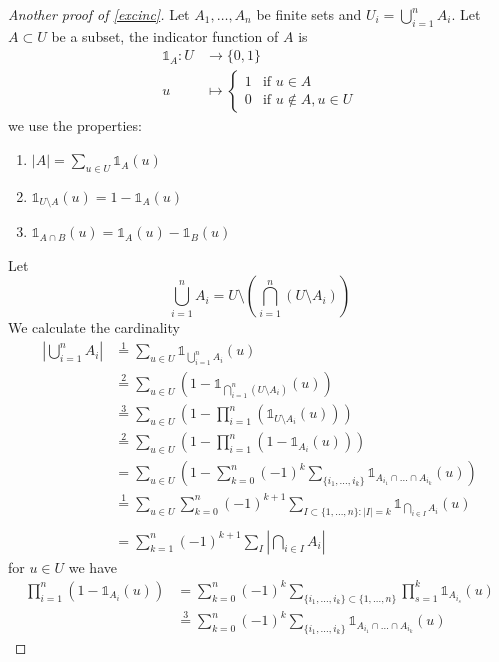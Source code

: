 \begin{example}
\begin{proof}[Another proof of \ref{excinc}]
Let $A_{1},\dots,A_{n}$ be finite sets and $U_{i}=\bigcup _{i=1}^{n}A_{i}$. Let $A\subset U$ be a subset, the indicator function of $A$ is
\begin{align*}
\mathbb{1}_{A}:U & \to \{ 0, 1\} \\
u & \mapsto \begin{cases}
1 & \text{if }u\in A \\
0 & \text{if }u\not\in A,u\in U
\end{cases}
\end{align*}
we use the properties:
\begin{enumerate}
\item $|A|=\sum _{u\in U}\mathbb{1}_{A}(u)$
\item $\mathbb{1}_{U\setminus A}(u)=1-\mathbb{1}_{A}(u)$
\item $\mathbb{1}_{A\cap B}(u)=\mathbb{1}_{A}(u)-\mathbb{1}_{B}(u)$
\end{enumerate}
Let
$$
\bigcup _{i=1}^{n}A_{i}=U\setminus\left( \bigcap _{i=1}^{n}(U\setminus A_{i}) \right)
$$
We calculate the cardinality
\begin{align*}
\left\lvert  \bigcup _{i=1}^{n}A_{i}  \right\rvert  & \overset{1} = \sum _{u\in U} \mathbb{1}_{\bigcup _{i=1}^{n}A_{i}}(u) \\
 & \overset{2}= \sum _{u\in U}\left( 1-\mathbb{1}_{\bigcap _{i=1}^{n}(U\setminus A_{i})}(u) \right) \\
 & \overset{3}=\sum _{u\in U}\left( 1-\prod_{i=1}^{n} (\mathbb{1}_{U\setminus A_{i}}(u)) \right) \\
 & \overset{2}=\sum _{u\in U}\left( 1-\prod _{i=1}^{n}(1-\mathbb{1}_{A_{i} }(u)) \right) \\
 & =\sum _{u\in U}\left( 1-\sum _{k=0}^{n}(-1)^{k}\sum _{\{ i_{1},\dots,i_{k} \}}\mathbb{1}_{A_{i_{1}}\cap\dots \cap A_{i_{k}}}(u) \right) \\
 & \overset{1}=\sum _{u\in U}\sum_{k=0}^{n} (-1)^{k+1}\sum _{I\subset \{ 1,\dots,n \}:|I|=k} \mathbb{1}_{\bigcap _{i\in I}A_{i} }(u) \\ \\
 & = \sum _{k=1}^{n}(-1)^{k+1}\sum _{I}\left\lvert  \bigcap _{i\in I}A_{i}  \right\rvert 
\end{align*}
for $u\in U$ we have 
\begin{align*}
\prod_{i=1}^{n} (1-\mathbb{1}_{A_{i}}(u)) & \overset{}=\sum_{k=0}^{n} (-1)^{k}\sum _{\{ i_{1},\dots,i_{k} \}\subset \{ 1,\dots,n \}}\prod _{s=1}^{k}\mathbb{1}_{A_{i_{s}}}(u) \\
	 & \overset{3}= \sum_{k=0}^{n} (-1)^{k}\sum _{\{ i_{1},\dots,i_{k}\}} \mathbb{1}_{A_{i_{1}}\cap\dots \cap A_{i_{k}}}(u)
\end{align*}

\end{proof}
\end{example}

